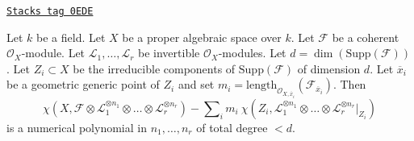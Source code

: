 \begin{lemma}
\label{spaces-over-fields-lemma-numerical-polynomial-leading-term}
\href{https://stacks.math.columbia.edu/tag/0EDE}{\texttt{Stacks tag 0EDE}}

Let $k$ be a field. Let $X$ be a proper algebraic space over $k$. Let
$\mathcal{F}$ be a coherent $\mathcal{O}_X$-module. Let
$\mathcal{L}_1, \ldots, \mathcal{L}_r$ be invertible $\mathcal{O}_X$-modules.
Let $d = \dim(\text{Supp}(\mathcal{F}))$.
Let $Z_i \subset X$ be the irreducible components
of $\text{Supp}(\mathcal{F})$ of dimension $d$. Let $\overline{x}_i$
be a geometric generic point of $Z_i$ and set
$m_i = \text{length}_{\mathcal{O}_{X, \overline{x}_i}}
(\mathcal{F}_{\overline{x}_i})$.
Then
$$
\chi(X, \mathcal{F} \otimes \mathcal{L}_1^{\otimes n_1} \otimes \ldots \otimes
\mathcal{L}_r^{\otimes n_r}) -
\sum\nolimits_i
m_i\ \chi(Z_i, \mathcal{L}_1^{\otimes n_1} \otimes \ldots \otimes
\mathcal{L}_r^{\otimes n_r}|_{Z_i})
$$
is a numerical polynomial in $n_1, \ldots, n_r$ of total degree $< d$.
\end{lemma}

